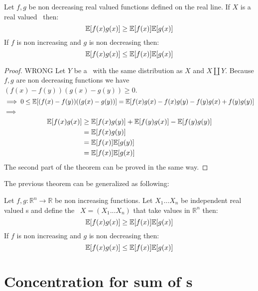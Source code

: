 \begin{teo}
	Let $f,g$ be non decreasing real valued functions defined on the real line. If $X$ is a real valued \rv \  then:$$\mathbb{E}[f(x)g(x)]\geq \mathbb{E}[f(x)]\mathbb{E}[g(x)]$$
	If $f$ is non increasing and $g$ is non decreasing then:
	$$\mathbb{E}[f(x)g(x)]\leq \mathbb{E}[f(x)]\mathbb{E}[g(x)]$$ 
\end{teo}
\begin{proof}
	WRONG
	Let $Y$ be a \rv \  with the same distribution as $X$ and $X\coprod Y$. Because $f,g$ are non decreasing functions we have $(f(x)-f(y))(g(x)-g(y))\geq 0$.
	\[
		\implies  0 \leq \mathbb{E}[(f(x)-f(y))((g(x)-g(y))]=\mathbb{E}[f(x)g(x)-f(x)g(y)-f(y)g(x) + f(y)g(y)]
	\]
	$\implies$
	\[
	\begin{split}
\mathbb{E}[f(x)g(x)] &\geq \mathbb{E}[f(x)g(y)]+ \mathbb{E}[f(y)g(x)]- \mathbb{E}[f(y)g(y)] \\&=\mathbb{E}[f(x)g(y)]\\&=\mathbb{E}[f(x)]\mathbb{E}[g(y)]\\&=\mathbb{E}[f(x)]\mathbb{E}[g(x)]
	\end{split}
	\]
	The second part of the theorem can be proved in the same way.
\end{proof}
The previous theorem can be generalized as following:
\begin{teo}
	Let $f,g: \mathbb{R}^n\to \mathbb{R}$ be non increasing functions. Let $X_1...X_n$ be independent real valued \rv s and define the \rv \ $X=(X_1...X_n)$ that take values in $\mathbb{R}^n$ then:
	$$\mathbb{E}[f(x)g(x)]\geq \mathbb{E}[f(x)]\mathbb{E}[g(x)]$$
	If $f$ is non increasing and $g$ is non decreasing then:
	$$\mathbb{E}[f(x)g(x)]\leq \mathbb{E}[f(x)]\mathbb{E}[g(x)]$$
\end{teo}

\section{Concentration for sum of \rv s}

